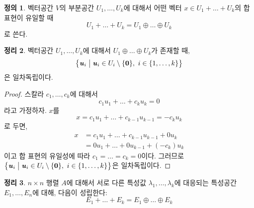 \documentclass[unfonts,oneside,a4paper]{oblivoir}
\theoremstyle{definition}
\newtheorem{definition}{정의}[section]
\theoremstyle{theorem}
\newtheorem{theorem}[definition]{정리}
\theoremstyle{theorem}
\theoremstyle{remark}
\theoremstyle{remark}
\theoremstyle{remark}
\theoremstyle{remark}
\renewcommand{\vec}[1]{\bm{\mathit{#1}}}
\newcommand{\vecz}{\bm{\mathrm{0}}}
\begin{document}
\begin{definition}
    벡터공간 $V$의 부분공간 $U_1, \dots, U_k$에 대해서 어떤 벡터 $\vec x \in U_1 + \dots + U_k$의 합 표현이 유일할 때
    \begin{equation*}
        U_1 + \dots + U_k = U_1 \oplus \dots \oplus U_k
    \end{equation*}
    로 쓴다.
\end{definition}

\begin{theorem} \label{thm:linear_independence_directsum}
    벡터공간 $U_1, \dots, U_k$에 대해서 $U_1 \oplus \dots \oplus U_k$가 존재할 때,
    \begin{equation*}
        \bigl\{\vec u_i \bigm| \vec u_i \in U_i \setminus \{\vecz\},\ i \in \{1, \dots, k\}\bigr\}
    \end{equation*}
    은 일차독립이다.
\end{theorem}

\begin{proof}
    스칼라 $c_1, \dots, c_k$에 대해서
    \begin{equation*}
        c_1 \vec u_1 + \dots + c_k \vec u_k = \vecz
    \end{equation*}
    라고 가정하자.
    $\vec x$를
    \begin{equation*}
        \vec x = c_1 \vec u_1 + \dots + c_{k - 1} \vec u_{k - 1} = -c_k \vec u_k
    \end{equation*}
    로 두면,
    \begin{align*}
        \vec x &= c_1 \vec u_1 + \dots + c_{k - 1} \vec u_{k - 1} + 0 \vec u_k\\
               &= 0 \vec u_1 + \dots + 0 \vec u_{k - 1} + (-c_k) \vec u_k
    \end{align*}
    이고 합 표현의 유일성에 따라 $c_1 = \dots = c_k = 0$이다.
    그러므로 $\bigl\{\vec u_i \bigm| \vec u_i \in U_i \setminus \{\vecz\},\ i \in \{1, \dots, k\}\bigr\}$은 일차독립이다.
\end{proof}

\begin{theorem} \label{thm:eigenspace_directsum}
    $n \times n$ 행렬 $A$에 대해서 서로 다른 특성값 $\lambda_1, \dots, \lambda_k$에 대응되는 특성공간 $E_1, \dots, E_n$에 대해, 다음이 성립한다:
    \begin{equation*}
        E_1 + \dots + E_k = E_1 \oplus \dots \oplus E_k
    \end{equation*}
\end{theorem}
\end{document}

